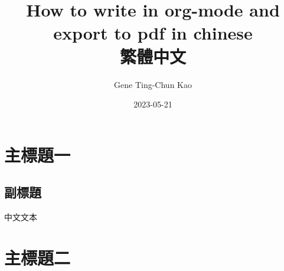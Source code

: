 \documentclass[11pt,a4paper]{article}
\author{Gene Ting-Chun Kao}
\date{2023-05-21}
\title{How to write in org-mode and export to pdf in chinese\\\medskip
\large 繁體中文}
\begin{document}
\maketitle
\begin{CJK*}{UTF8}{bsmi}


\section*{主標題一}
\label{sec:org648f1d8}

\subsection*{副標題}
\label{sec:orgd01df1c}

中文文本




\section*{主標題二}
\label{sec:orgeeb67e7}




\end{CJK*}
\end{document}
